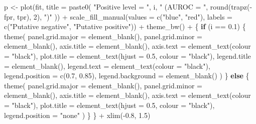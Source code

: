 \documentclass[
  11pt,
  oneside]{book}
\newenvironment{Shaded}{\begin{snugshade}}{\end{snugshade}}
\newcommand{\AttributeTok}[1]{\textcolor[rgb]{0.77,0.63,0.00}{#1}}
\newcommand{\ControlFlowTok}[1]{\textcolor[rgb]{0.13,0.29,0.53}{\textbf{#1}}}
\newcommand{\DecValTok}[1]{\textcolor[rgb]{0.00,0.00,0.81}{#1}}
\newcommand{\FloatTok}[1]{\textcolor[rgb]{0.00,0.00,0.81}{#1}}
\newcommand{\FunctionTok}[1]{\textcolor[rgb]{0.00,0.00,0.00}{#1}}
\newcommand{\NormalTok}[1]{#1}
\newcommand{\OtherTok}[1]{\textcolor[rgb]{0.56,0.35,0.01}{#1}}
\newcommand{\SpecialCharTok}[1]{\textcolor[rgb]{0.00,0.00,0.00}{#1}}
\newcommand{\StringTok}[1]{\textcolor[rgb]{0.31,0.60,0.02}{#1}}
\begin{document}
\begin{Shaded}
\begin{Highlighting}[]
\NormalTok{  p }\OtherTok{\textless{}{-}} \FunctionTok{plot}\NormalTok{(fit, }\AttributeTok{title =} \FunctionTok{paste0}\NormalTok{(}
    \StringTok{"Positive level = "}\NormalTok{, i,}
    \StringTok{" (AUROC = "}\NormalTok{, }\FunctionTok{round}\NormalTok{(}\FunctionTok{trapz}\NormalTok{(}\SpecialCharTok{{-}}\NormalTok{fpr, tpr), }\DecValTok{2}\NormalTok{), }\StringTok{")"}
\NormalTok{  )) }\SpecialCharTok{+}
    \FunctionTok{scale\_fill\_manual}\NormalTok{(}\AttributeTok{values =} \FunctionTok{c}\NormalTok{(}\StringTok{"blue"}\NormalTok{, }\StringTok{"red"}\NormalTok{), }\AttributeTok{labels =} \FunctionTok{c}\NormalTok{(}\StringTok{"Putative negative"}\NormalTok{, }\StringTok{"Putative positive"}\NormalTok{)) }\SpecialCharTok{+}
    \FunctionTok{theme\_bw}\NormalTok{() }\SpecialCharTok{+}
\NormalTok{    \{}
      \ControlFlowTok{if}\NormalTok{ (i }\SpecialCharTok{==} \FloatTok{0.1}\NormalTok{) \{}
        \FunctionTok{theme}\NormalTok{(}
          \AttributeTok{panel.grid.major =} \FunctionTok{element\_blank}\NormalTok{(),}
          \AttributeTok{panel.grid.minor =} \FunctionTok{element\_blank}\NormalTok{(),}
          \AttributeTok{axis.title =} \FunctionTok{element\_blank}\NormalTok{(),}
          \AttributeTok{axis.text =} \FunctionTok{element\_text}\NormalTok{(}\AttributeTok{colour =} \StringTok{"black"}\NormalTok{),}
          \AttributeTok{plot.title =} \FunctionTok{element\_text}\NormalTok{(}\AttributeTok{hjust =} \FloatTok{0.5}\NormalTok{, }\AttributeTok{colour =} \StringTok{"black"}\NormalTok{),}
          \AttributeTok{legend.title =} \FunctionTok{element\_blank}\NormalTok{(),}
          \AttributeTok{legend.text =} \FunctionTok{element\_text}\NormalTok{(}\AttributeTok{colour =} \StringTok{"black"}\NormalTok{),}
          \AttributeTok{legend.position =} \FunctionTok{c}\NormalTok{(}\FloatTok{0.7}\NormalTok{, }\FloatTok{0.85}\NormalTok{),}
          \AttributeTok{legend.background =} \FunctionTok{element\_blank}\NormalTok{()}
\NormalTok{        )}
\NormalTok{      \} }\ControlFlowTok{else}\NormalTok{ \{}
        \FunctionTok{theme}\NormalTok{(}
          \AttributeTok{panel.grid.major =} \FunctionTok{element\_blank}\NormalTok{(),}
          \AttributeTok{panel.grid.minor =} \FunctionTok{element\_blank}\NormalTok{(),}
          \AttributeTok{axis.title =} \FunctionTok{element\_blank}\NormalTok{(),}
          \AttributeTok{axis.text =} \FunctionTok{element\_text}\NormalTok{(}\AttributeTok{colour =} \StringTok{"black"}\NormalTok{),}
          \AttributeTok{plot.title =} \FunctionTok{element\_text}\NormalTok{(}\AttributeTok{hjust =} \FloatTok{0.5}\NormalTok{, }\AttributeTok{colour =} \StringTok{"black"}\NormalTok{),}
          \AttributeTok{legend.position =} \StringTok{"none"}
\NormalTok{        )}
\NormalTok{      \}}
\NormalTok{    \} }\SpecialCharTok{+}
    \FunctionTok{xlim}\NormalTok{(}\SpecialCharTok{{-}}\FloatTok{0.8}\NormalTok{, }\FloatTok{1.5}\NormalTok{)}


\end{Highlighting}
\end{Shaded}
\end{document}
